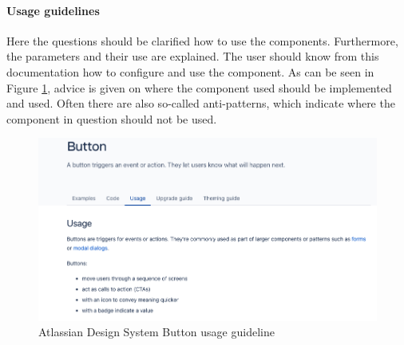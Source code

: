 \paragraph*{Usage guidelines} Here the questions should be clarified how to use the components. Furthermore, the parameters and their use are explained. The user should know from this documentation how to configure and use the component. \cite{vesselov_building_2019} As can be seen in Figure \ref{atlassian_button}, advice is given on where the component used should be implemented and used. Often there are also so-called anti-patterns, which indicate where the component in question should not be used.
\begin{figure}[htb]
\centerline{\includegraphics[width=\linewidth]{images/atlassian_button_usage.png}}
\caption{Atlassian Design System Button usage guideline \cite{atlassian_design_system_atlassian_nodate}}
\label{atlassian_button}
\end{figure}
